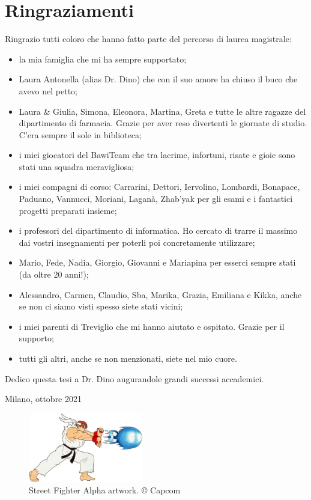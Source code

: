 %
%
\chapter*{Ringraziamenti}

Ringrazio tutti coloro che hanno fatto parte del percorso di laurea magistrale:
\begin{itemize}
	\item la mia famiglia che mi ha sempre supportato;
	\item Laura Antonella (alias Dr. Dino) che con il suo amore ha chiuso il buco che avevo nel petto;
	\item Laura \& Giulia, Simona, Eleonora, Martina, Greta e tutte le altre ragazze del dipartimento di farmacia. Grazie per aver reso divertenti le giornate di studio. C'era sempre il sole in biblioteca;
	\item i miei giocatori del BawiTeam che tra lacrime, infortuni, risate e gioie sono stati una squadra meravigliosa;
	\item i miei compagni di corso: Carrarini, Dettori, Iervolino, Lombardi, Bonapace, Paduano, Vannucci, Moriani, Laganà, Zhab'yak per gli esami e i fantastici progetti preparati insieme;
	\item i professori del dipartimento di informatica. Ho cercato di trarre il massimo dai vostri insegnamenti per poterli poi concretamente utilizzare;
	\item Mario, Fede, Nadia, Giorgio, Giovanni e Mariapina per esserci sempre stati (da oltre 20 anni!);
	\item Alessandro, Carmen, Claudio, Sba, Marika, Grazia, Emiliana e Kikka, anche se non ci siamo visti spesso siete stati vicini;	
	\item i miei parenti di Treviglio che mi hanno aiutato e ospitato. Grazie per il supporto;
	\item tutti gli altri, anche se non menzionati, siete nel mio cuore.
\end{itemize}

Dedico questa tesi a Dr. Dino augurandole grandi successi accademici.

\begin{flushright}
	Milano, ottobre 2021
\end{flushright}

\vspace*{\fill}

\begin{figure}[H]
	\centering
	\includegraphics[width=5cm]{immagini/hadoken}
	\caption{Street Fighter Alpha artwork. © Capcom}
	\label{fig:hadoken}
\end{figure}